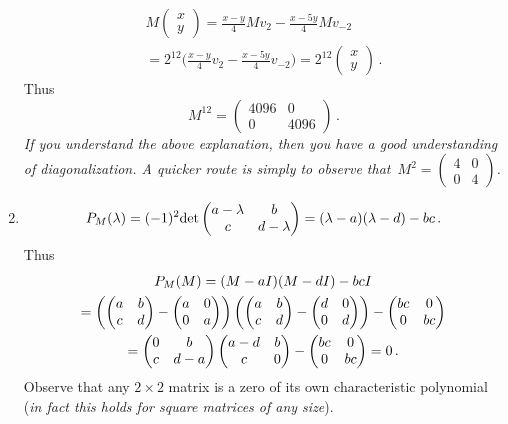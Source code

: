 \begin{enumerate}
\begin{gather*}
M \begin{pmatrix} x \\ y \end{pmatrix} = \frac{x-y}{4} M v_2  -\frac{x-5y}4 M v_{-2}\\ = 2^{12} \Big(\frac{x-y}{4}  v_2 -\frac{x-5y}4  v_{-2}\Big) 
= 2^{12} \begin{pmatrix} x \\ y \end{pmatrix}\, .
\end{gather*}
Thus \[M^{12}=\begin{pmatrix} 4096 & 0 \\ 0 & 4096\end{pmatrix}\, .\]
{\itshape If you understand the above explanation, then you have a good understanding of diagonalization.  A quicker route  
is simply to observe that~$M^2 = \begin{pmatrix}4 & 0 \\ 0 & 4\end{pmatrix} $.}

\item 
\[
P_M(\lambda) = (-1)^2 {\rm det}\begin{pmatrix} a-\lambda & \mc b  \\ \mc c &d-\lambda\end{pmatrix}
=(\lambda-a)(\lambda-d) - bc\, . 
\]
Thus
\begin{gather*}
P_M(M)=(M-a I )(M- d I) - bc I \\= 
\left(\begin{pmatrix}a&b\\c&d\end{pmatrix}-\begin{pmatrix}a&0\\0&a\end{pmatrix}\right)
\left(\begin{pmatrix}a&b\\c&d\end{pmatrix}-\begin{pmatrix}d&0\\0&d\end{pmatrix}\right)-\begin{pmatrix}bc&0\\0&bc\end{pmatrix}
\\
=\begin{pmatrix}0&\mc b\\c&d-a\end{pmatrix}\begin{pmatrix}a-d&b\\\mc c&0\end{pmatrix}-\begin{pmatrix}bc&0\\0&bc\end{pmatrix}=0\, .
\end{gather*}
Observe that any $2\times 2$ matrix is a zero of its own characteristic polynomial ({\itshape in fact this holds for square matrices of any size}).


\end{enumerate}
